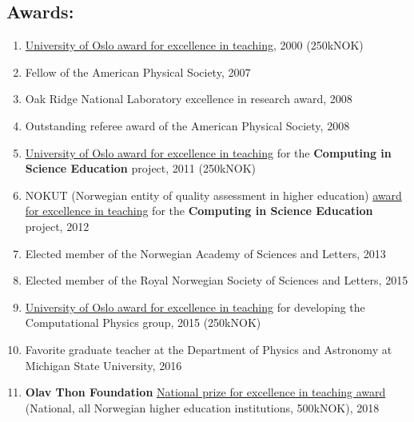 \documentclass[%
oneside,                 %
final,                   %
10pt]{article}
\begin{document}
\subsection*{Awards:}

\begin{enumerate}
\item \href{{http://www.uniforum.uio.no/nyheter/2000/11/det-viktigste-er-aa-inspirere.html}}{University of Oslo award for excellence in teaching}, 2000 (250kNOK)

\item Fellow of the American Physical Society, 2007

\item Oak Ridge National Laboratory excellence in research award, 2008

\item Outstanding referee award of the American Physical Society, 2008

\item \href{{http://www.uniforum.uio.no/nyheter/2011/08/undervisning-for-framtidig-forsking.html}}{University of Oslo award for excellence in teaching} for the \textbf{Computing in Science Education} project, 2011 (250kNOK)

\item NOKUT (Norwegian entity of quality assessment in higher education) \href{{http://www.uniforum.uio.no/nyheter/2012/04/uio-tok-andreplass-i-utdanningskvalitet.html}}{award for excellence in teaching} for the \textbf{Computing in Science Education} project, 2012

\item Elected member of the Norwegian Academy of Sciences and Letters, 2013

\item Elected member of the Royal Norwegian Society of Sciences and Letters, 2015 

\item \href{{http://www.uniforum.uio.no/nyheter/2015/10/instituttet-som-lofter-fram-gode-forelesere.html}}{University of Oslo award for excellence in teaching} for developing the Computational Physics group, 2015 (250kNOK)

\item Favorite graduate teacher at the Department of Physics and Astronomy at Michigan State University, 2016 

\item \textbf{Olav Thon Foundation} \href{{https://www.ntbinfo.no/pressemelding/olav-thon-stiftelsen-annonserte-arets-priser-42-millioner-til-forskning-og-undervisning?publisherId=8983491&releaseId=16475069}}{National prize for excellence in teaching award} (National, all Norwegian higher education institutions, 500kNOK), 2018


\end{enumerate}
\end{document}
